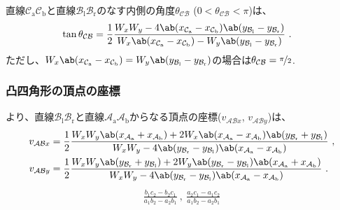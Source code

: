 直線$\mathcal C_\mathrm a\mathcal C_\mathrm b$と直線$\mathcal B_\mathrm l\mathcal B_\mathrm r$のなす内側の角度$\theta_{\mathcal{CB}}$ ($0 < \theta_{\mathcal{CB}} < \pi$)は、
\begin{align*}
  \tan\theta_{\mathcal{CB}}
  &= \frac12
     \frac{W_xW_y
           -4\ab(x_{\mathcal C_\mathrm a}-x_{\mathcal C_\mathrm b})
             \ab(y_{\mathcal B_\mathrm l}-y_{\mathcal B_\mathrm r})}
          {W_x\ab(x_{\mathcal C_\mathrm a}-x_{\mathcal C_\mathrm b})
           -W_y\ab(y_{\mathcal B_\mathrm l}-y_{\mathcal B_\mathrm r})}\ .
\end{align*}
ただし、$W_x\ab(x_{\mathcal C_\mathrm a}-x_{\mathcal C_\mathrm b}) = W_y\ab(y_{\mathcal B_\mathrm l}-y_{\mathcal B_\mathrm r})$の場合は$\theta_{\mathcal{CB}} = \nicefrac\pi2$.

\clearpage
\subsubsection{凸四角形の頂点の座標\TBW}
より、直線$\mathcal B_\mathrm l\mathcal B_\mathrm r$と直線$\mathcal A_\mathrm a\mathcal A_\mathrm b$からなる頂点の座標($v_{\mathcal{AB}x}$, $v_{\mathcal{AB}y}$)は、
\begin{align*}
  v_{\mathcal{AB}x}
  &= \frac12\frac{
       W_xW_y\ab(x_{\mathcal A_\mathrm a}+x_{\mathcal A_\mathrm b})
       +2W_x\ab(x_{\mathcal A_\mathrm a}-x_{\mathcal A_\mathrm b})\ab(y_{\mathcal B_\mathrm r}+y_{\mathcal B_\mathrm l})
     }{
       W_xW_y
       -4\ab(y_{\mathcal B_\mathrm r}-y_{\mathcal B_\mathrm l})\ab(x_{\mathcal A_\mathrm a}-x_{\mathcal A_\mathrm b})
     }\ ,\\
  v_{\mathcal{AB}y}
  &= \frac12\frac{
       W_xW_y\ab(y_{\mathcal B_\mathrm r}+y_{\mathcal B_\mathrm l})
       +2W_y\ab(y_{\mathcal B_\mathrm r}-y_{\mathcal B_\mathrm l})\ab(x_{\mathcal A_\mathrm a}+x_{\mathcal A_\mathrm b})
     }{
       W_xW_y
       -4\ab(y_{\mathcal B_\mathrm r}-y_{\mathcal B_\mathrm l})\ab(x_{\mathcal A_\mathrm a}-x_{\mathcal A_\mathrm b})
     }\ .
\end{align*}
\begin{align*}
  \frac{b_1c_2-b_2c_1}{a_1b_2-a_2b_1}~,~
  \frac{a_2c_1-a_1c_2}{a_1b_2-a_2b_1}
\end{align*}

